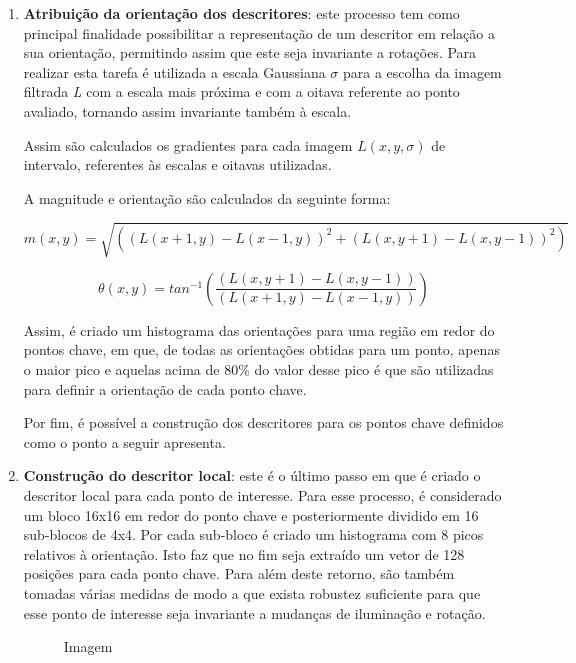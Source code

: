 \begin{enumerate}
\item \textbf{Atribuição da orientação dos descritores}: este processo tem como principal finalidade possibilitar a representação de um descritor em relação a sua orientação, permitindo assim que este seja invariante a rotações. Para realizar esta tarefa é utilizada a escala Gaussiana $ \sigma $ para a escolha da imagem filtrada \textit{L} com a escala mais próxima e com a oitava referente ao ponto avaliado, tornando assim invariante também à escala.

Assim são calculados os gradientes para cada imagem $ L(x, y, \sigma) $ de intervalo, referentes às escalas e oitavas utilizadas.

A magnitude e orientação são calculados da seguinte forma:

\begin{equation}
m(x,y) = \sqrt{\left ( \left ( L(x+1, y) - L(x-1, y) \right )^2 + \left ( L(x, y+1) - L(x, y-1) \right )^2  \right )}
\end{equation}

\begin{equation}
\theta (x, y) = tan^{-1}\left ( \frac{\left ( L(x, y+1) - L(x, y-1) \right )}{\left ( L(x+1, y) - L(x-1, y) \right )} \right )
\end{equation}

Assim, é criado um histograma das orientações para uma região em redor do pontos chave, em que, de todas as orientações obtidas para um ponto, apenas o maior pico e aquelas acima de 80\% do valor desse pico é que são utilizadas para definir a orientação de cada ponto chave.

Por fim, é possível a construção dos descritores para os pontos chave definidos como o ponto a seguir apresenta.

\item \textbf{Construção do descritor local}: este é o último passo em que é criado o descritor local para cada ponto de interesse. Para esse processo, é considerado um bloco 16x16 em redor do ponto chave e posteriormente dividido em 16 sub-blocos de 4x4. Por cada sub-bloco é criado um histograma com 8 picos relativos à orientação. Isto faz que no fim seja extraído um vetor de 128 posições para cada ponto chave. Para além deste retorno, são também tomadas várias medidas de modo a que exista robustez suficiente para que esse ponto de interesse seja invariante a mudanças de iluminação e rotação. 

\begin{figure}
\centering
\caption{Imagem}
\end{figure}
 
\end{enumerate}

